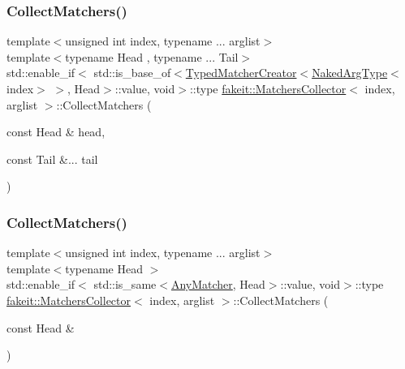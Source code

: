 \subsubsection{\texorpdfstring{CollectMatchers()}{CollectMatchers()}\hspace{0.1cm}{\footnotesize\ttfamily [29/63]}}
{\footnotesize\ttfamily template$<$unsigned int index, typename ... arglist$>$ \\
template$<$typename Head , typename ... Tail$>$ \\
std\+::enable\+\_\+if$<$ std\+::is\+\_\+base\+\_\+of$<$\mbox{\hyperlink{structfakeit_1_1TypedMatcherCreator}{Typed\+Matcher\+Creator}}$<$\mbox{\hyperlink{classfakeit_1_1MatchersCollector_aeda8ced6a2f0cb7c6e4f916f18a91730}{Naked\+Arg\+Type}}$<$index$>$ $>$, Head$>$\+::value, void$>$\+::type \mbox{\hyperlink{classfakeit_1_1MatchersCollector}{fakeit\+::\+Matchers\+Collector}}$<$ index, arglist $>$\+::Collect\+Matchers (\begin{DoxyParamCaption}\item[{const Head \&}]{head,  }\item[{const Tail \&...}]{tail }\end{DoxyParamCaption})\hspace{0.3cm}{\ttfamily [inline]}}

\mbox{\label{classfakeit_1_1MatchersCollector_a89350af9ba2e7aaead8bd7b007f03631}} 
\subsubsection{\texorpdfstring{CollectMatchers()}{CollectMatchers()}\hspace{0.1cm}{\footnotesize\ttfamily [30/63]}}
{\footnotesize\ttfamily template$<$unsigned int index, typename ... arglist$>$ \\
template$<$typename Head $>$ \\
std\+::enable\+\_\+if$<$ std\+::is\+\_\+same$<$\mbox{\hyperlink{structfakeit_1_1AnyMatcher}{Any\+Matcher}}, Head$>$\+::value, void$>$\+::type \mbox{\hyperlink{classfakeit_1_1MatchersCollector}{fakeit\+::\+Matchers\+Collector}}$<$ index, arglist $>$\+::Collect\+Matchers (\begin{DoxyParamCaption}\item[{const Head \&}]{ }\end{DoxyParamCaption})\hspace{0.3cm}{\ttfamily [inline]}}

